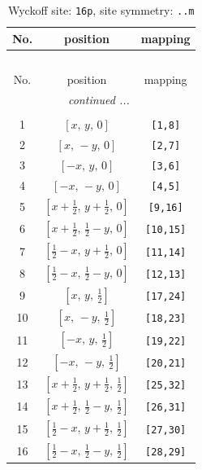 \documentclass[fleqn,8pt]{jsarticle}
\begin{document}
\renewcommand{\arraystretch}{1.2}
\begin{longtable}{ccc}
\caption{Wyckoff site: {\tt 16p}, site symmetry: {\tt ..m}}
 \\
 \hline \hline
No. & position & mapping \\ \hline \endfirsthead

\multicolumn{2}{l}{\tablename\ \thetable{}} \\
 \hline \hline
No. & position & mapping \\ \hline \endhead

 \hline \hline
\multicolumn{2}{r}{\footnotesize\it continued ...} \\ \endfoot

 \hline \hline
\multicolumn{2}{r}{} \\ \endlastfoot

1 & $\left[ x,\, y,\, 0 \right]$ & {\tt [1,8]} \\ \hline
2 & $\left[ x,\, - y,\, 0 \right]$ & {\tt [2,7]} \\ \hline
3 & $\left[ - x,\, y,\, 0 \right]$ & {\tt [3,6]} \\ \hline
4 & $\left[ - x,\, - y,\, 0 \right]$ & {\tt [4,5]} \\ \hline
5 & $\left[ x + \frac{1}{2},\, y + \frac{1}{2},\, 0 \right]$ & {\tt [9,16]} \\ \hline
6 & $\left[ x + \frac{1}{2},\, \frac{1}{2} - y,\, 0 \right]$ & {\tt [10,15]} \\ \hline
7 & $\left[ \frac{1}{2} - x,\, y + \frac{1}{2},\, 0 \right]$ & {\tt [11,14]} \\ \hline
8 & $\left[ \frac{1}{2} - x,\, \frac{1}{2} - y,\, 0 \right]$ & {\tt [12,13]} \\ \hline
9 & $\left[ x,\, y,\, \frac{1}{2} \right]$ & {\tt [17,24]} \\ \hline
10 & $\left[ x,\, - y,\, \frac{1}{2} \right]$ & {\tt [18,23]} \\ \hline
11 & $\left[ - x,\, y,\, \frac{1}{2} \right]$ & {\tt [19,22]} \\ \hline
12 & $\left[ - x,\, - y,\, \frac{1}{2} \right]$ & {\tt [20,21]} \\ \hline
13 & $\left[ x + \frac{1}{2},\, y + \frac{1}{2},\, \frac{1}{2} \right]$ & {\tt [25,32]} \\ \hline
14 & $\left[ x + \frac{1}{2},\, \frac{1}{2} - y,\, \frac{1}{2} \right]$ & {\tt [26,31]} \\ \hline
15 & $\left[ \frac{1}{2} - x,\, y + \frac{1}{2},\, \frac{1}{2} \right]$ & {\tt [27,30]} \\ \hline
16 & $\left[ \frac{1}{2} - x,\, \frac{1}{2} - y,\, \frac{1}{2} \right]$ & {\tt [28,29]} \\
\end{longtable}
\end{document}
